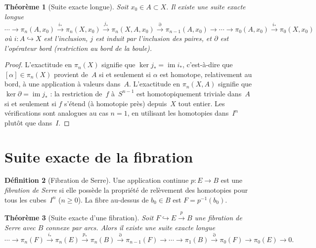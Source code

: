 \documentclass[12pt,a4paper,openany]{book}
\theoremstyle{definition}
\newtheorem{definition}{Définition}[chapter]
\theoremstyle{plain}
\newtheorem{theoreme}[definition]{Théorème}
\theoremstyle{remark}
\DeclareMathOperator{\im}{im}
\begin{document}
\begin{theoreme}[Suite exacte longue]\label{thm:suite-exacte-homotopie}
  Soit $x_0 \in A \subset X$. Il existe une suite exacte longue
  \[
    \cdots \to \pi_n(A, x_0) \xrightarrow{i_*} \pi_n(X, x_0)
    \xrightarrow{j_*} \pi_n(X, A, x_0)
    \xrightarrow{\partial} \pi_{n-1}(A, x_0) \to \cdots
    \to \pi_0(A, x_0) \xrightarrow{i_*} \pi_0(X, x_0)
  \]
  où $i \colon A \hookrightarrow X$ est l'inclusion, $j$ est induit par
  l'inclusion des paires, et $\partial$ est l'opérateur bord (restriction au bord
  de la boule).
\end{theoreme}

\begin{proof}
  L'exactitude en $\pi_n(X)$ signifie que $\ker j_* = \im i_*$, c'est-à-dire que
  $[\alpha] \in \pi_n(X)$ provient de~$A$ si et seulement si $\alpha$ est homotope,
  relativement au bord, à une application à valeurs dans~$A$. L'exactitude en
  $\pi_n(X, A)$ signifie que $\ker \partial = \im j_*$ : la restriction de~$f$
  à~$S^{n-1}$ est homotopiquement triviale dans~$A$ si et seulement si $f$ s'étend
  (à homotopie près) depuis~$X$ tout entier. Les vérifications sont analogues au
  cas $n = 1$, en utilisant les homotopies dans~$I^n$ plutôt que dans~$I$.
\end{proof}

\section{Suite exacte de la fibration}\label{sec:suite-fibration}

\begin{definition}[Fibration de Serre]\label{def:fibration-serre}
  Une application continue $p \colon E \to B$ est une \emph{fibration de Serre} si
  elle possède la propriété de relèvement des homotopies pour tous les cubes~$I^n$
  ($n \geq 0$). La fibre au-dessus de $b_0 \in B$ est $F = p^{-1}(b_0)$.
\end{definition}

\begin{theoreme}[Suite exacte d'une fibration]\label{thm:suite-exacte-fibration}
  Soit $F \hookrightarrow E \xrightarrow{p} B$ une fibration de Serre avec $B$
  connexe par arcs. Alors il existe une suite exacte longue
  \[
    \cdots \to \pi_n(F) \xrightarrow{i_*} \pi_n(E) \xrightarrow{p_*} \pi_n(B)
    \xrightarrow{\partial} \pi_{n-1}(F) \to \cdots
    \to \pi_1(B) \xrightarrow{\partial} \pi_0(F) \to \pi_0(E) \to 0.
  \]
\end{theoreme}
\end{document}
